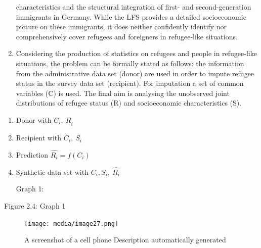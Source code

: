 \documentclass[
]{article}
\begin{document}
\begin{enumerate}
  characteristics and the structural integration of first- and
  second-generation immigrants in Germany. While the LFS provides a
  detailed socioeconomic picture on these immigrants, it does neither
  confidently identify nor comprehensively cover refugees and
  foreigners in refugee-like situations.
\item
  Considering the production of statistics on refugees and people in
  refugee-like situations, the problem can be formally stated as
  follows: the information from the administrative data set (donor)
  are used in order to impute refugee status in the survey data set
  (recipient). For imputation a set of common variables (C) is used.
  The final aim is analysing the unobserved joint distributions of
  refugee status (R) and socioeconomic characteristics (S).
\end{enumerate}

\begin{enumerate}
\def\labelenumi{(\arabic{enumi})}
\item
  Donor with \({C_{i},\ R}_{i}\)
\item
  Recipient with \(C_{i},\ S_{i}\)
\item
  Prediction \(\widehat{R_{i}} = f(C_{i})\)
\item
  Synthetic data set with \(C_{i},S_{i},\ \widehat{R_{i}}\)

  Graph 1:
\end{enumerate}

Figure 2.4: Graph 1

\begin{figure}
\centering
\texttt{[image: media/image27.png]}
\caption{A screenshot of a cell phone Description automatically
generated}
\end{figure}
\end{document}
